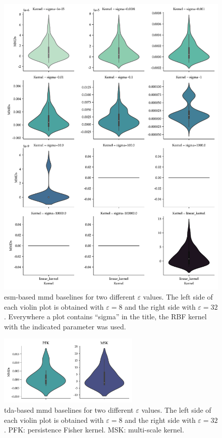 \begin{figure}
  \centering
  \includegraphics[width=\textwidth]{./figures/results/esm_baselines.pdf}
  \caption[\acrshort{esm}-based \acrshort{mmd} baselines for two different
$\varepsilon$ values.]{\acrshort{esm}-based \acrshort{mmd} baselines for two
different $\varepsilon$ values. The left side of each violin plot is obtained
with $\varepsilon=8$ and the right side with $\varepsilon=32$. Everywhere a plot
contains ``sigma'' in the title, the RBF kernel with the indicated parameter was
used.}
\end{figure}

\begin{figure}
  \centering
  \includegraphics[width=0.6\textwidth]{./figures/results/tda_baselines.pdf}
  \caption[\acrshort{tda}-based \acrshort{mmd} baselines for two different
$\varepsilon$ values.]{\acrshort{tda}-based \acrshort{mmd} baselines for two
different $\varepsilon$ values. The left side of each violin plot is obtained
with $\varepsilon=8$ and the right side with $\varepsilon=32$. PFK: persistence
Fisher kernel. MSK: multi-scale kernel.}
\end{figure}

